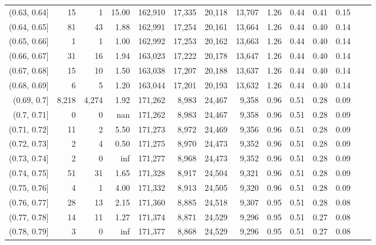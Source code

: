 \begin{tabular}{rrrrrrrrrrrrrr}
(0.63, 0.64]   &      15 &      1 &  15.00 &  162,910 &   17,335 &  20,118 &  13,707 &  1.26 &  0.44 &  0.41 &      0.15 \\
(0.64, 0.65]   &      81 &     43 &   1.88 &  162,991 &   17,254 &  20,161 &  13,664 &  1.26 &  0.44 &  0.40 &      0.14 \\
(0.65, 0.66]   &       1 &      1 &   1.00 &  162,992 &   17,253 &  20,162 &  13,663 &  1.26 &  0.44 &  0.40 &      0.14 \\
(0.66, 0.67]   &      31 &     16 &   1.94 &  163,023 &   17,222 &  20,178 &  13,647 &  1.26 &  0.44 &  0.40 &      0.14 \\
(0.67, 0.68]   &      15 &     10 &   1.50 &  163,038 &   17,207 &  20,188 &  13,637 &  1.26 &  0.44 &  0.40 &      0.14 \\
(0.68, 0.69]   &       6 &      5 &   1.20 &  163,044 &   17,201 &  20,193 &  13,632 &  1.26 &  0.44 &  0.40 &      0.14 \\
(0.69, 0.7]    &   8,218 &  4,274 &   1.92 &  171,262 &    8,983 &  24,467 &   9,358 &  0.96 &  0.51 &  0.28 &      0.09 \\
(0.7, 0.71]    &       0 &      0 &    nan &  171,262 &    8,983 &  24,467 &   9,358 &  0.96 &  0.51 &  0.28 &      0.09 \\
(0.71, 0.72]   &      11 &      2 &   5.50 &  171,273 &    8,972 &  24,469 &   9,356 &  0.96 &  0.51 &  0.28 &      0.09 \\
(0.72, 0.73]   &       2 &      4 &   0.50 &  171,275 &    8,970 &  24,473 &   9,352 &  0.96 &  0.51 &  0.28 &      0.09 \\
(0.73, 0.74]   &       2 &      0 &    inf &  171,277 &    8,968 &  24,473 &   9,352 &  0.96 &  0.51 &  0.28 &      0.09 \\
(0.74, 0.75]   &      51 &     31 &   1.65 &  171,328 &    8,917 &  24,504 &   9,321 &  0.96 &  0.51 &  0.28 &      0.09 \\
(0.75, 0.76]   &       4 &      1 &   4.00 &  171,332 &    8,913 &  24,505 &   9,320 &  0.96 &  0.51 &  0.28 &      0.09 \\
(0.76, 0.77]   &      28 &     13 &   2.15 &  171,360 &    8,885 &  24,518 &   9,307 &  0.95 &  0.51 &  0.28 &      0.08 \\
(0.77, 0.78]   &      14 &     11 &   1.27 &  171,374 &    8,871 &  24,529 &   9,296 &  0.95 &  0.51 &  0.27 &      0.08 \\
(0.78, 0.79]   &       3 &      0 &    inf &  171,377 &    8,868 &  24,529 &   9,296 &  0.95 &  0.51 &  0.27 &      0.08 \\

\end{tabular}
